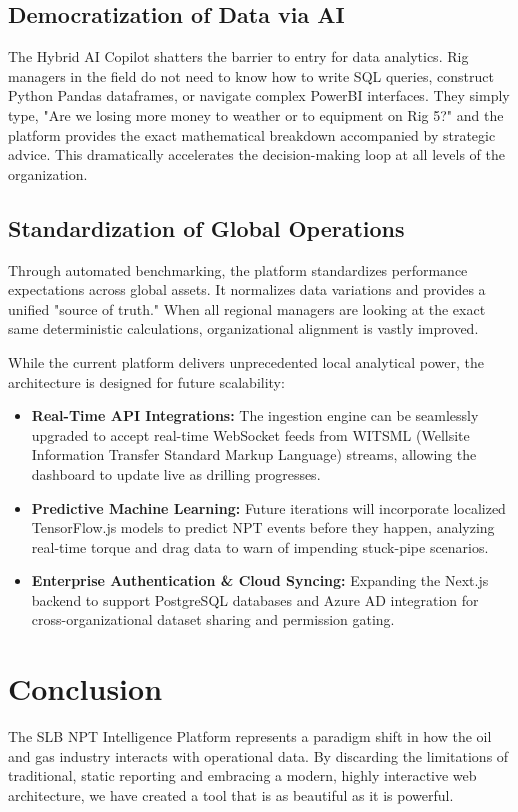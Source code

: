 \documentclass[11pt,a4paper]{article}
\begin{document}
\subsection{Democratization of Data via AI}
The Hybrid AI Copilot shatters the barrier to entry for data analytics. Rig managers in the field do not need to know how to write SQL queries, construct Python Pandas dataframes, or navigate complex PowerBI interfaces. They simply type, "Are we losing more money to weather or to equipment on Rig 5?" and the platform provides the exact mathematical breakdown accompanied by strategic advice. This dramatically accelerates the decision-making loop at all levels of the organization.

\subsection{Standardization of Global Operations}
Through automated benchmarking, the platform standardizes performance expectations across global assets. It normalizes data variations and provides a unified "source of truth." When all regional managers are looking at the exact same deterministic calculations, organizational alignment is vastly improved.

While the current platform delivers unprecedented local analytical power, the architecture is designed for future scalability:
\begin{itemize}
    \item \textbf{Real-Time API Integrations:} The ingestion engine can be seamlessly upgraded to accept real-time WebSocket feeds from WITSML (Wellsite Information Transfer Standard Markup Language) streams, allowing the dashboard to update live as drilling progresses.
    \item \textbf{Predictive Machine Learning:} Future iterations will incorporate localized TensorFlow.js models to predict NPT events before they happen, analyzing real-time torque and drag data to warn of impending stuck-pipe scenarios.
    \item \textbf{Enterprise Authentication \& Cloud Syncing:} Expanding the Next.js backend to support PostgreSQL databases and Azure AD integration for cross-organizational dataset sharing and permission gating.
\end{itemize}

\section{Conclusion}
The SLB NPT Intelligence Platform represents a paradigm shift in how the oil and gas industry interacts with operational data. By discarding the limitations of traditional, static reporting and embracing a modern, highly interactive web architecture, we have created a tool that is as beautiful as it is powerful. 
\end{document}

